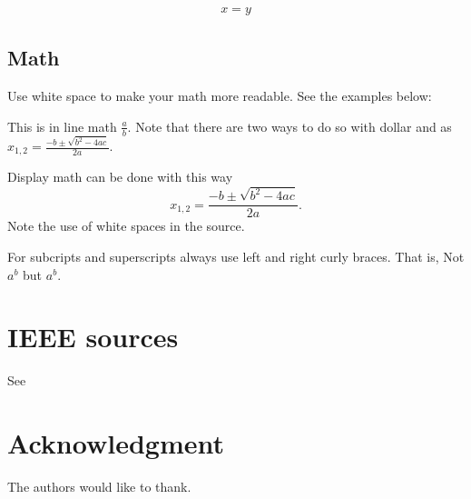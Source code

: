 \documentclass[10pt,journal,compsoc]{IEEEtran}
\theoremstyle{plain}
\theoremstyle{definition}
\theoremstyle{remark}
\begin{document}
\begin{align}
	x = y
	\label{eq:bbb}
\end{align}




\subsection{Math}
Use white space to make your math more readable.
See the examples below:

This is in line math
$
	\frac
		{a}
		{b}.
$
Note that there are two ways to do so with dollar and as
\(
	x_{1,2}
	= \frac
		{-b \pm \sqrt{b^{2} - 4 a c}}
		{2 a}.
\)

Display math can be done with this way
\[
	x_{1,2}
	= \frac
		{-b \pm \sqrt{b^{2} - 4 a c}}
		{2 a}.
\]
 Note the use of white spaces in the source.
 
 For subcripts and superscripts always use left and right curly braces.
 That is,
 Not $a^b$ but $a^{b}$.



\section{IEEE sources}

See 



\section*{Acknowledgment}

The authors would like to thank.



\end{document}
